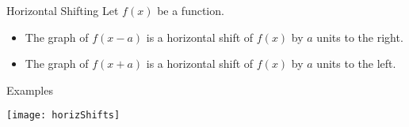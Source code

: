 \documentclass[Lecture.tex]{subfiles}
\begin{document}
\begin{frame}{Horizontal Shifting}
  Let $f(x)$ be a function.
  \begin{itemize}
    \item<3->
      The graph of $f(x - a)$ is a horizontal shift of $f(x)$ by $a$ units to the right.
    \item<4->
      The graph of $f(x + a)$ is a horizontal shift of $f(x)$ by $a$ units to the left.
  \end{itemize}
\end{frame}

\begin{frame}{Examples}
  \begin{center}
    \texttt{[image: horizShifts]}
  \end{center}
\end{frame}
\end{document}
